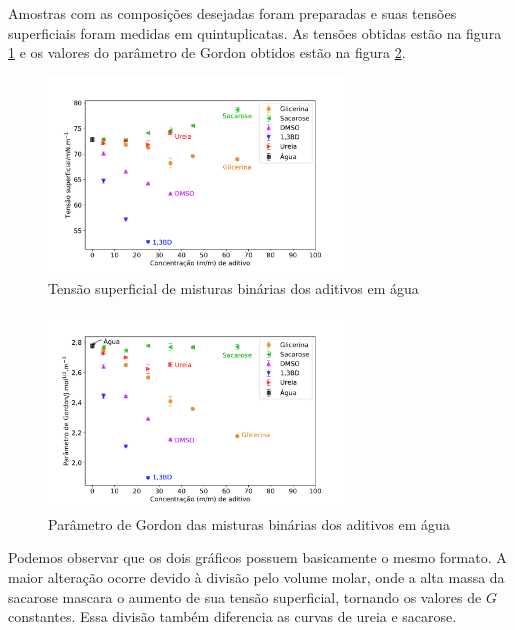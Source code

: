 		Amostras com as composições desejadas foram preparadas e suas tensões superficiais foram medidas em quintuplicatas. As tensões obtidas estão na figura \ref{fig:tensao_superficial_por_conc} e os valores do parâmetro de Gordon obtidos estão na figura \ref{fig:param_gordon_por_conc}.
		
		\begin{figure}[h]
			\centering
			\includegraphics[width=0.7\textwidth]{imagens/propriedades/tensao_superficial}
			\caption{Tensão superficial de misturas binárias dos aditivos em água}
			\label{fig:tensao_superficial_por_conc}
		\end{figure}
		
		\begin{figure}[h]
			\centering
			\includegraphics[width=0.7\textwidth]{imagens/propriedades/param_gordon}
			\caption{Parâmetro de Gordon das misturas binárias dos aditivos em água}
			\label{fig:param_gordon_por_conc}
		\end{figure}
		
		Podemos observar que os dois gráficos possuem basicamente o mesmo formato. A maior alteração ocorre devido à divisão pelo volume molar, onde a alta massa da sacarose mascara o aumento de sua tensão superficial, tornando os valores de \(G\) constantes. Essa divisão também diferencia as curvas de ureia e sacarose.
		
